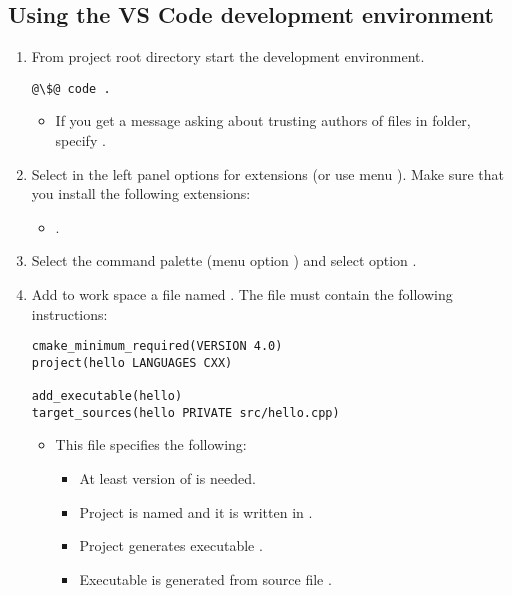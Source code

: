 \subsection{Using the \textbf{VS Code} development environment}

\begin{enumerate}

\item 
From project root directory start the
development environment.

\begin{lstlisting}[style=terminal,escapechar=@]
@\$@ code .
\end{lstlisting}

  \begin{itemize}
    \item If you get a message asking about trusting authors of files
          in folder, specify .
  \end{itemize}

\item
Select in the left panel options for extensions
(or use menu ). 
Make sure that you install the following extensions:

  \begin{itemize}
    \item {}.
  \end{itemize}

\item
Select the command palette
(menu option ) 
and select option
.

\item
Add to work space a file named 
. 
The file must contain the following instructions:

\begin{lstlisting}
cmake_minimum_required(VERSION 4.0)
project(hello LANGUAGES CXX)

add_executable(hello)
target_sources(hello PRIVATE src/hello.cpp)
\end{lstlisting}

  \begin{itemize}
    \item This file specifies the following:
      \begin{itemize}
        \item At least version  of  is needed.
        \item Project is named  and it is written in .
        \item Project generates executable .
        \item Executable  is generated from source file
              .
      \end{itemize}
  \end{itemize}


\end{enumerate}
